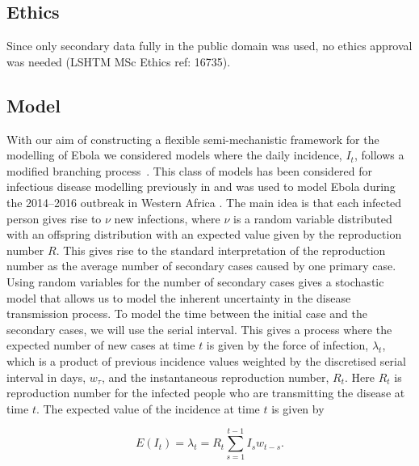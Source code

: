\documentclass[12pt]{article}
\begin{document}
\subsection{Ethics}
Since only secondary data fully in the public domain was used, no ethics approval was needed (LSHTM MSc Ethics ref: 16735). 

\subsection{Model}

With our aim of constructing a flexible semi-mechanistic framework for the modelling of Ebola we considered models where the daily incidence, $I_t$, follows a modified branching process~\cite{jacobBranchingProcessesTheir2010}. This class of models has been considered for infectious disease modelling previously in \cite{coriNewFrameworkSoftware2013,lloyd-smithSuperspreadingEffectIndividual2005,nouvelletSimpleApproachMeasure2018} and was used to model Ebola during the 2014--2016 outbreak in Western Africa \cite{whoebolaresponseteamEbolaVirusDisease2014, internationalebolaresponseteamExposurePatternsDriving2016}. The main idea is that each infected person gives rise to $\nu$ new infections, where $\nu$ is a random variable distributed with an offspring distribution with an expected value given by the reproduction number $R$. This gives rise to the standard interpretation of the reproduction number as the average number of secondary cases caused by one primary case. Using random variables for the number of secondary cases gives a stochastic model that allows us to model the inherent uncertainty in the disease transmission process. To model the time between the initial case and the secondary cases, we will use the serial interval. This gives a process where the expected number of new cases at time $t$ is given by the force of infection, $\lambda_t$, which is a product of previous incidence values weighted by the discretised serial interval in days, $w_\tau$, and the instantaneous reproduction number, $R_t$. Here $R_t$ is reproduction number for the infected people who are transmitting the disease at time $t$. The expected value of the incidence at time $t$ is given by

\begin{equation}
  E(I_t) = \lambda_t =  R_t \sum^{t-1}_{s=1} I_s w_{t-s}.
  \label{eq:mean_It}
\end{equation}
\end{document}
